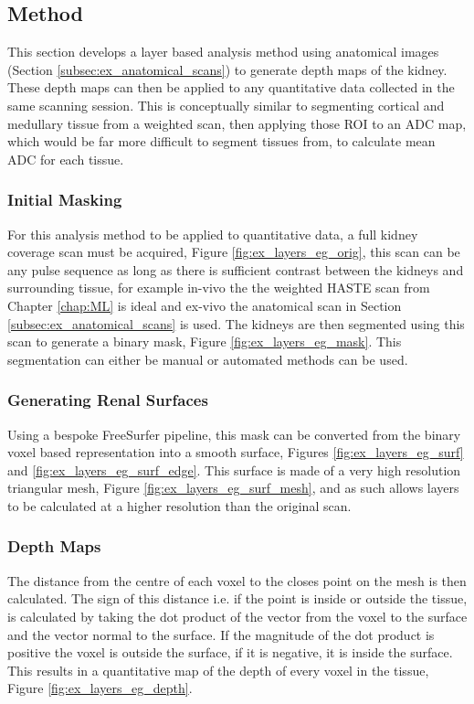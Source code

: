 \subsection{Method}
This section develops a layer based analysis method using anatomical images (Section \ref{subsec:ex_anatomical_scans}) to generate depth maps of the kidney. These depth maps can then be applied to any quantitative data collected in the same scanning session. This is conceptually similar to segmenting cortical and medullary tissue from a \tone weighted scan, then applying those \ac{ROI} to an \ac{ADC} map, which would be far more difficult to segment tissues from, to calculate mean \ac{ADC} for each tissue.

\subsubsection{Initial Masking}
For this analysis method to be applied to quantitative data, a full kidney coverage scan must be acquired, Figure \ref{fig:ex_layers_eg_orig}, this scan can be any pulse sequence as long as there is sufficient contrast between the kidneys and surrounding tissue, for example in-vivo the the \ttwo weighted \ac{HASTE} scan from Chapter \ref{chap:ML} is ideal and ex-vivo the anatomical scan in Section \ref{subsec:ex_anatomical_scans} is used. The kidneys are then segmented using this scan to generate a binary mask, Figure \ref{fig:ex_layers_eg_mask}. This segmentation can either be manual or automated methods can be used. 

\subsubsection{Generating Renal Surfaces}
Using a bespoke FreeSurfer \cite{dale_cortical_1999} pipeline, this mask can be converted from the binary voxel based representation into a smooth surface, Figures \ref{fig:ex_layers_eg_surf} and \ref{fig:ex_layers_eg_surf_edge}. This surface is made of a very high resolution triangular mesh, Figure \ref{fig:ex_layers_eg_surf_mesh}, and as such allows layers to be calculated at a higher resolution than the original scan. 

\subsubsection{Depth Maps}
The distance from the centre of each voxel to the closes point on the mesh is then calculated. The sign of this distance i.e. if the point is inside or outside the tissue, is calculated by taking the dot product of the vector from the voxel to the surface and the vector normal to the surface. If the magnitude of the dot product is positive the voxel is outside the surface, if it is negative, it is inside the surface. This results in a quantitative map of the depth of every voxel in the tissue, Figure \ref{fig:ex_layers_eg_depth}.

